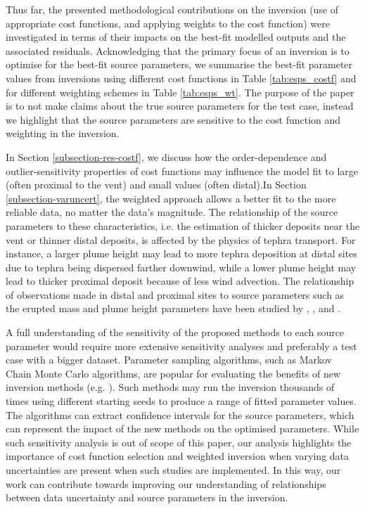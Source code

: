 \documentclass[a4paper,fleqn]{cas-sc}
\begin{document}
Thus far, the presented methodological contributions on the inversion (use of appropriate cost functions, and applying weights to the cost function) were investigated in terms of their impacts on the best-fit modelled outputs and the associated residuals. Acknowledging that the primary focus of an inversion is to optimise for the best-fit source parameters, we summarise the best-fit parameter values from inversions using different cost functions in Table \ref{tab:esps_costf} and for different weighting schemes in Table \ref{tab:esps_wt}. The purpose of the paper is to not make claims about the true source parameters for the test case, instead we highlight that the source parameters are sensitive to the cost function and weighting in the inversion. 

In Section \ref{subsection-res-costf}, we discuss how the order-dependence and outlier-sensitivity properties of cost functions may influence the model fit to large (often proximal to the vent) and small values (often distal).In Section \ref{subsection-varuncert}, the weighted approach allows a better fit to the more reliable data, no matter the data's magnitude. The relationship of the source parameters to these characteristics, i.e. the estimation of thicker deposits near the vent or thinner distal deposits, is affected by the physics of tephra transport. For instance, a larger plume height may lead to more tephra deposition at distal sites due to tephra being dispersed farther downwind, while a lower plume height may lead to thicker proximal deposit because of less wind advection. The relationship of observations made in distal and proximal sites to source parameters such as the erupted mass and plume height parameters have been studied by \citet{suzuki1983theoretical}, \cite{bonadonna2005probabilistic}, and \cite{yang2021tephra}.

A full understanding of the sensitivity of the proposed methods to each source parameter would require more extensive sensitivity analyses and preferably a test case with a bigger dataset. Parameter sampling algorithms, such as Markov Chain Monte Carlo algorithms, are popular for evaluating the benefits of new inversion methods (e.g. \cite{white2017efficient, yang2021tephra}). Such methods may run the inversion thousands of times using different starting seeds to produce a range of fitted parameter values. The algorithms can extract confidence intervals for the source parameters, which can represent the impact of the new methods on the optimised parameters. While such sensitivity analysis is out of scope of this paper, our analysis highlights the importance of cost function selection and weighted inversion when varying data uncertainties are present when such studies are implemented. In this way, our work can contribute towards improving our understanding of relationships between data uncertainty and source parameters in the inversion.
\end{document}
